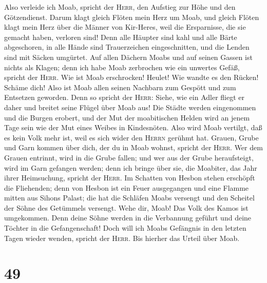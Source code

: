  Also verleide ich Moab, spricht der \textsc{Herr}, den
Aufstieg zur Höhe und den Götzendienst.  Darum klagt
gleich Flöten mein Herz um Moab, und gleich Flöten klagt mein Herz über
die Männer von Kir-Heres, weil die Ersparnisse, die sie gemacht haben,
verloren sind!  Denn alle Häupter sind kahl und alle
Bärte abgeschoren, in alle Hände sind Trauerzeichen eingeschnitten, und
die Lenden sind mit Säcken umgürtet.  Auf allen Dächern
Moabs und auf seinen Gassen ist nichts als Klagen; denn ich habe Moab
zerbrochen wie ein unwertes Gefäß, spricht der \textsc{Herr}.
 Wie ist Moab erschrocken! Heulet! Wie wandte es den
Rücken! Schäme dich! Also ist Moab allen seinen Nachbarn zum Gespött und
zum Entsetzen geworden.  Denn so spricht der
\textsc{Herr}: Siehe, wie ein Adler fliegt er daher und breitet seine
Flügel über Moab aus!  Die Städte werden eingenommen und
die Burgen erobert, und der Mut der moabitischen Helden wird an jenem
Tage sein wie der Mut eines Weibes in Kindesnöten.  Also
wird Moab vertilgt, daß es kein Volk mehr ist, weil es sich wider den
\textsc{Herrn} gerühmt hat.  Grauen, Grube und Garn
kommen über dich, der du in Moab wohnst, spricht der \textsc{Herr}.
 Wer dem Grauen entrinnt, wird in die Grube fallen; und
wer aus der Grube heraufsteigt, wird im Garn gefangen werden; denn ich
bringe über sie, die Moabiter, das Jahr ihrer Heimsuchung, spricht der
\textsc{Herr}.  Im Schatten von Hesbon stehen erschöpft
die Fliehenden; denn von Hesbon ist ein Feuer ausgegangen und eine
Flamme mitten aus Sihons Palast; die hat die Schläfen Moabs versengt und
den Scheitel der Söhne des Getümmels versengt.  Wehe dir,
Moab! Das Volk des Kamos ist umgekommen. Denn deine Söhne werden in die
Verbannung geführt und deine Töchter in die Gefangenschaft!
 Doch will ich Moabs Gefängnis in den letzten Tagen
wieder wenden, spricht der \textsc{Herr}. Bis hierher das Urteil über
Moab.

\hypertarget{section-48}{%
\section{49}\label{section-48}}


